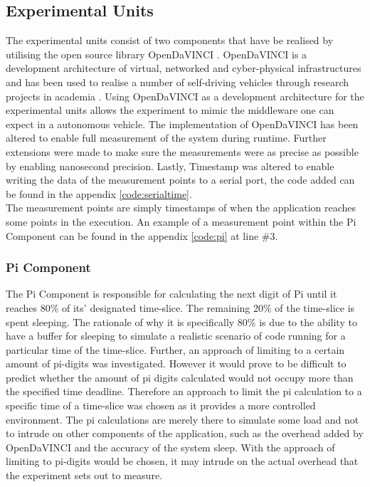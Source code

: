 \subsection{Experimental Units}
\label{section:exp-units}

The experimental units consist of two components that have be realised by utilising the open source library OpenDaVINCI \cite{OpenDaVINCI}. OpenDaVINCI is a development architecture of virtual, networked and cyber-physical infrastructures and has been used to realise a number of self-driving vehicles through research projects in academia \cite{OpenDaVINCI}. Using OpenDaVINCI as a development architecture for the experimental units allows the experiment to mimic the middleware one can expect in a autonomous vehicle. The implementation of OpenDaVINCI has been altered to enable full measurement of the system during runtime. Further extensions were made to make sure the measurements were as precise as possible by enabling nanosecond precision. Lastly, Timestamp was altered to enable writing the data of the measurement points to a serial port, the code added can be found in the appendix \ref{code:serialtime}.\\
The measurement points are simply timestamps of when the application reaches some points in the execution. An example of a measurement point within the Pi Component can be found in the appendix \ref{code:pi} at line \#3.\\


\subsubsection{Pi Component}

The Pi Component is responsible for calculating the next digit of Pi until it reaches 80\% of its' designated time-slice. The remaining 20\% of the time-slice is spent sleeping. The rationale of why it is specifically 80\% is due to the ability to have a buffer for sleeping to simulate a realistic scenario of code running for a particular time of the time-slice. Further, an approach of limiting to a certain amount of pi-digits was investigated. However it would prove to be difficult to predict whether the amount of pi digits calculated would not occupy more than the specified time deadline. Therefore an approach to limit the pi calculation to a specific time of a time-slice was chosen as it provides a more controlled environment. The pi calculations are merely there to simulate some load and not to intrude on other components of the application, such as the overhead added by OpenDaVINCI and the accuracy of the system sleep. With the approach of limiting to pi-digits would be chosen, it may intrude on the actual overhead that the experiment sets out to measure.\\

